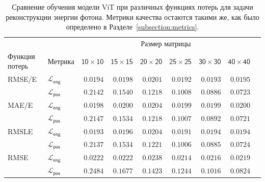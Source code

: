 \documentclass[a4paper,12pt]{extarticle}
\begin{document}
\begin{table}[ht]
	\footnotesize
	\centering
	\begin{tabular}{llrrrrrrr}
		\toprule
		{} & {} & \multicolumn{6}{c}{\textsf{Размер матрицы}} \\
		\cmidrule(lr){3-8}
		\textsf{Функция потерь} & \textsf{Метрика} & $\mathsf{10 \times 10}$ &  $\mathsf{15 \times 15}$ &  $\mathsf{20 \times 20}$ &  $\mathsf{25 \times 25}$ &  $\mathsf{30 \times 30}$ &  $\mathsf{40 \times 40}$ \\
		\midrule
        \textsf{RMSE/E} & $\mathcal{L}_{\mathsf{eng}}$ & $\mathsf{0.0194}$ & $\mathsf{0.0198}$ & $\mathsf{0.0201}$ & $\mathsf{0.0192}$ & $\mathsf{0.0193}$ & $\mathsf{0.0195}$ \\
        {} & $\mathcal{L}_{\mathsf{pos}}$ & $\mathsf{0.2142}$ & $\mathsf{0.1540}$ & $\mathsf{0.1218}$ & $\mathsf{0.1008}$ & $\mathsf{0.0886}$ & $\mathsf{0.0723}$ \\
        \midrule
        \textsf{MAE/E} & $\mathcal{L}_{\mathsf{eng}}$ & $\mathsf{0.0198}$ & $\mathsf{0.0200}$ & $\mathsf{0.0204}$ & $\mathsf{0.0199}$ & $\mathsf{0.0199}$ & $\mathsf{0.0200}$ \\
        {} & $\mathcal{L}_{\mathsf{pos}}$ & $\mathsf{0.2147}$ & $\mathsf{0.1534}$ & $\mathsf{0.1218}$ & $\mathsf{0.1007}$ & $\mathsf{0.0892}$ & $\mathsf{0.0721}$ \\
        \midrule
        \textsf{RMSLE} & $\mathcal{L}_{\mathsf{eng}}$ & $\mathsf{0.0193}$ & $\mathsf{0.0196}$ & $\mathsf{0.0204}$ & $\mathsf{0.0191}$ & $\mathsf{0.0194}$ & $\mathsf{0.0194}$ \\
        {} & $\mathcal{L}_{\mathsf{pos}}$ & $\mathsf{0.2137}$ & $\mathsf{0.1534}$ & $\mathsf{0.1221}$ & $\mathsf{0.1006}$ & $\mathsf{0.0885}$ & $\mathsf{0.0724}$ \\
        \midrule
        \textsf{RMSE} & $\mathcal{L}_{\mathsf{eng}}$ & $\mathsf{0.0222}$ & $\mathsf{0.0222}$ & $\mathsf{0.0238}$ & $\mathsf{0.0214}$ & $\mathsf{0.0216}$ & $\mathsf{0.0219}$ \\
        {} & $\mathcal{L}_{\mathsf{pos}}$ & $\mathsf{0.2484}$ & $\mathsf{0.1677}$ & $\mathsf{0.1423}$ & $\mathsf{0.1244}$ & $\mathsf{0.1016}$ & $\mathsf{0.0824}$ \\        
		\bottomrule
	\end{tabular}
    \caption{Сравнение обучения модели \textsf{ViT} при различных функциях потерь для задачи реконструкции энергии фотона. Метрики качества остаются такими же, как было определено в Разделе~\ref{subsection:metrics}.}
	\label{table:loss_comp}
\end{table}
\end{document}
